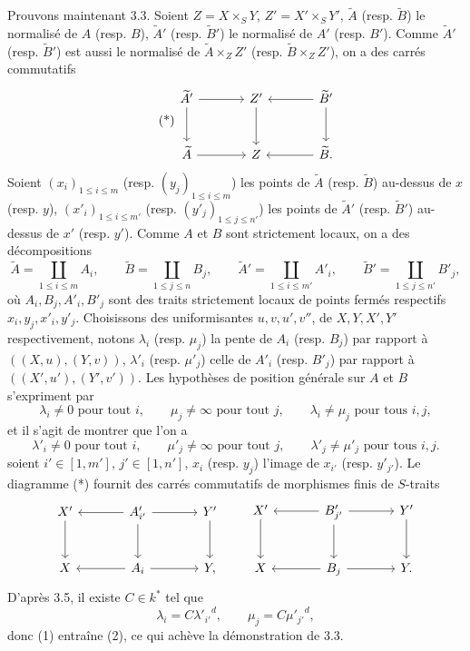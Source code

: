 \documentclass[11pt]{article}
\begin{document}
Prouvons maintenant 3.3. Soient $Z=X\times_SY$, $Z'=X'\times_SY'$, $\widetilde A$ (resp. $\widetilde B$) le normalisé de $A$ (resp. $B$), $\widetilde A'$ (resp. $\widetilde B'$) le normalisé de $A'$ (resp. $B'$). Comme $\widetilde A'$ (resp. $\widetilde B'$) est aussi le normalisé de $\widetilde A\times_ZZ'$ (resp. $\widetilde B\times_ZZ'$), on a des carrés commutatifs
\begin{equation}
\tag{*}
\begin{tikzcd}[column sep=large,row sep=large]
\widetilde A' \arrow[r] \arrow[d] & Z' \arrow[d] & \widetilde B' \arrow[l] \arrow[d]\\
\widetilde A \arrow[r] & Z & \widetilde B . \arrow[l]
\end{tikzcd}
\end{equation}
Soient $(x_i)_{1\le i\le m}$ (resp. $(y_j)_{1\le i\le m}$) les points de $\widetilde A$ (resp. $\widetilde B$) au-dessus de $x$ (resp. $y$), $(x'_i)_{1\le i\le m'}$ (resp. $(y'_j)_{1\le j\le n'}$) les points de $\widetilde A'$ (resp. $\widetilde B'$) au-dessus de $x'$ (resp. $y'$). Comme $A$ et $B$ sont strictement locaux, on a des décompositions
\[
\widetilde A=\coprod_{1\le i\le m}A_i,\qquad
\widetilde B=\coprod_{1\le j\le n}B_j,\qquad
\widetilde A'=\coprod_{1\le i\le m'}A'_i,\qquad
\widetilde B'=\coprod_{1\le j\le n'}B'_j,
\]
où $A_i,B_j,A'_i,B'_j$ sont des traits strictement locaux de points fermés respectifs $x_i,y_j,x'_i,y'_j$. Choisissons des uniformisantes $u,v,u',v''$, de $X,Y,X',Y'$ respectivement, notons $\lambda_i$ (resp. $\mu_j$) la pente de $A_i$ (resp. $B_j$) par rapport à $((X,u),(Y,v))$, $\lambda'_i$ (resp. $\mu'_j$) celle de $A'_i$ (resp. $B'_j$) par rapport à $((X',u'),(Y',v'))$. Les hypothèses de position générale sur $A$ et $B$ s'expriment par
\begin{equation}
\lambda_i\ne0\text{ pour tout }i,\qquad
\mu_j\ne\infty\text{ pour tout }j,\qquad
\lambda_i\ne\mu_j\text{ pour tous }i,j,
\tag{1}
\end{equation}
et il s'agit de montrer que l'on a
\begin{equation}
\lambda'_i\ne0\text{ pour tout }i,\qquad
\mu'_j\ne\infty\text{ pour tout }j,\qquad
\lambda'_j\ne\mu'_j\text{ pour tous }i,j.
\tag{2}
\end{equation}
soient $i'\in[1,m']$, $j'\in[1,n']$, $x_i$ (resp. $y_j$) l'image de $x_{i'}$ (resp. $y'_{j'}$). Le diagramme (*) fournit des carrés commutatifs de morphismes finis de $S$-traits
\[
\begin{tikzcd}[column sep=large,row sep=large]
X' \arrow[d] & A'_{i'} \arrow[l] \arrow[r] \arrow[d] & Y' \arrow[d]\\
X & A_i \arrow[l] \arrow[r] & Y ,
\end{tikzcd}
\qquad
\begin{tikzcd}[column sep=large,row sep=large]
X' \arrow[d] & B'_{j'} \arrow[l] \arrow[r] \arrow[d] & Y' \arrow[d]\\
X & B_j \arrow[l] \arrow[r] & Y .
\end{tikzcd}
\]
D'après 3.5, il existe $C\in k^*$ tel que
\[
\lambda_i=C{\lambda'_{i'}}^d,\qquad
\mu_j=C{\mu'_{j'}}^d,
\]
donc (1) entraîne (2), ce qui achève la démonstration de 3.3.
\end{document}
